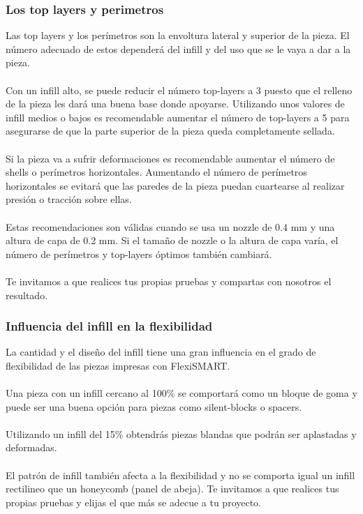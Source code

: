 \documentclass[11pt,a4paper]{article}
\begin{document}
		\subsubsection{Los top layers y perimetros}
Las top layers y los perímetros son la envoltura lateral y superior de la pieza. El número adecuado de estos dependerá del infill y del uso que se le vaya a dar a la pieza.
\\\\
Con un infill alto, se puede reducir el número top-layers a 3 puesto que el relleno de la pieza les dará una buena base donde apoyarse. Utilizando unos valores de infill medios o bajos es recomendable aumentar el número de top-layers a 5 para asegurarse de que la parte superior de la pieza queda completamente sellada.
\\\\
Si la pieza va a sufrir deformaciones es recomendable aumentar el número de shells o perímetros horizontales. Aumentando el número de perímetros horizontales se evitará que las paredes de la pieza puedan cuartearse al realizar presión o tracción sobre ellas.
\\\\
Estas recomendaciones son válidas cuando se usa un nozzle de 0.4 mm y una altura de capa de 0.2 mm. Si el tamaño de nozzle o la altura de capa varía, el número de perímetros y top-layers óptimos también cambiará.
\\\\
Te invitamos a que realices tus propias pruebas y compartas con nosotros el resultado.
		\subsubsection{Influencia del infill en la flexibilidad}
La cantidad y el diseño del infill tiene una gran influencia en el grado de flexibilidad de las piezas impresas con FlexiSMART.
\\\\
Una pieza con un infill cercano al 100\% se comportará como un bloque de goma y puede ser una buena opción para piezas como silent-blocks o spacers.
\\\\
Utilizando un infill del 15\% obtendrás piezas blandas que podrán ser aplastadas y deformadas.
\\\\
El patrón de infill también afecta a la flexibilidad y no se comporta igual un infill rectilineo que un honeycomb (panel de abeja).  Te invitamos a que realices tus propias pruebas y elijas el que más se adecue a tu proyecto.
\end{document}
